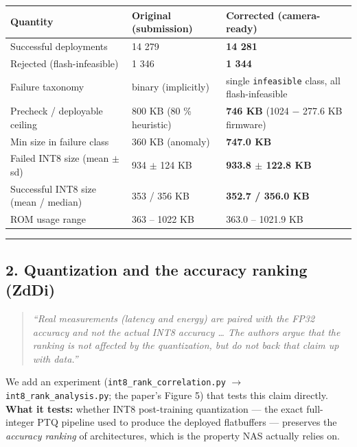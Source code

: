 \documentclass[11pt]{article}
\begin{document}
\begin{center}\footnotesize\setlength{\tabcolsep}{4pt}
\begin{tabular}{lll}
\toprule
Quantity & Original (submission) & Corrected (camera-ready) \\
\midrule
Successful deployments & 14 279 & \textbf{14 281} \\
Rejected (flash-infeasible) & 1 346 & \textbf{1 344} \\
Failure taxonomy & binary (implicitly) & single \texttt{infeasible} class, all flash-infeasible \\
Precheck / deployable ceiling & 800 KB (80 \% heuristic) & \textbf{746 KB} (1024 $-$ 277.6 KB firmware) \\
Min size in failure class & 360 KB (anomaly) & \textbf{747.0 KB} \\
Failed INT8 size (mean $\pm$ sd) & 934 $\pm$ 124 KB & \textbf{933.8 $\pm$ 122.8 KB} \\
Successful INT8 size (mean / median) & 353 / 356 KB & \textbf{352.7 / 356.0 KB} \\
ROM usage range & 363 -- 1022 KB & 363.0 -- 1021.9 KB \\
\bottomrule
\end{tabular}
\end{center}



\vspace{2pt}\hrule\vspace{6pt}

\subsection*{2. Quantization and the accuracy ranking (ZdDi)}

\begin{quote}\itshape
\textit{``Real measurements (latency and energy) are paired with the FP32 accuracy and not the actual INT8 accuracy \ldots{} The authors argue that the ranking is not affected by the quantization, but do not back that claim up with data.''}
\end{quote}

We add an experiment (\texttt{int8\_\allowbreak{}rank\_\allowbreak{}correlation.py} $\to$ \texttt{int8\_\allowbreak{}rank\_\allowbreak{}analysis.py}; the paper's Figure 5) that tests this claim directly. \textbf{What it tests:} whether INT8 post-training quantization --- the exact full-integer PTQ pipeline used to produce the deployed flatbuffers --- preserves the \textit{accuracy ranking} of architectures, which is the property NAS actually relies on.
\end{document}
